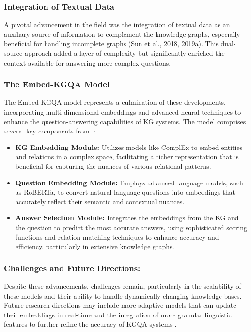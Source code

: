 \documentclass[12pt]{article}
\begin{document}
\subsubsection{Integration of Textual Data}
A pivotal advancement in the field was the integration of textual data as an auxiliary source of information to complement the knowledge graphs, especially beneficial for handling incomplete graphs (Sun et al., 2018, 2019a). This dual-source approach added a layer of complexity but significantly enriched the context available for answering more complex questions.

\subsubsection{The Embed-KGQA Model}
The Embed-KGQA model \parencite{saxena-etal-2020-improving} represents a culmination of these developments, incorporating multi-dimensional embeddings and advanced neural techniques to enhance the question-answering capabilities of KG systems. The model comprises several key components from \textcite{Pan2023UnifyingLL}.:
\sloppy
\begin{itemize}
    \item \textbf{KG Embedding Module:} Utilizes models like ComplEx to embed entities and relations in a complex space, facilitating a richer representation that is beneficial for capturing the nuances of various relational patterns.
    \item \textbf{Question Embedding Module:} Employs advanced language models, such as RoBERTa, to convert natural language questions into embeddings that accurately reflect their semantic and contextual nuances.
    \item \textbf{Answer Selection Module:} Integrates the embeddings from the KG and the question to predict the most accurate answers, using sophisticated scoring functions and relation matching techniques to enhance accuracy and efficiency, particularly in extensive knowledge graphs.

\end{itemize}
\fussy
\subsubsection{Challenges and Future Directions:} Despite these advancements, challenges remain, particularly in the scalability of these models and their ability to handle dynamically changing knowledge bases. Future research directions may include more adaptive models that can update their embeddings in real-time and the integration of more granular linguistic features to further refine the accuracy of KGQA systems \parencite{Pan2023UnifyingLL}.
\end{document}

